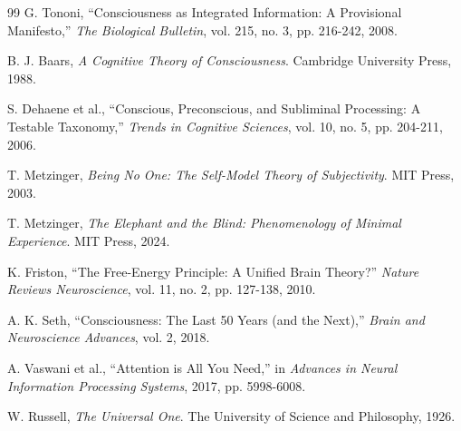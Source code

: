 \documentclass[11pt]{article}
\begin{document}
\begin{thebibliography}{99}
G. Tononi, ``Consciousness as Integrated Information: A Provisional Manifesto,'' \textit{The Biological Bulletin}, vol. 215, no. 3, pp. 216-242, 2008.

B. J. Baars, \textit{A Cognitive Theory of Consciousness}. Cambridge University Press, 1988.

S. Dehaene et al., ``Conscious, Preconscious, and Subliminal Processing: A Testable Taxonomy,'' \textit{Trends in Cognitive Sciences}, vol. 10, no. 5, pp. 204-211, 2006.

T. Metzinger, \textit{Being No One: The Self-Model Theory of Subjectivity}. MIT Press, 2003.

T. Metzinger, \textit{The Elephant and the Blind: Phenomenology of Minimal Experience}. MIT Press, 2024.

K. Friston, ``The Free-Energy Principle: A Unified Brain Theory?'' \textit{Nature Reviews Neuroscience}, vol. 11, no. 2, pp. 127-138, 2010.

A. K. Seth, ``Consciousness: The Last 50 Years (and the Next),'' \textit{Brain and Neuroscience Advances}, vol. 2, 2018.

A. Vaswani et al., ``Attention is All You Need,'' in \textit{Advances in Neural Information Processing Systems}, 2017, pp. 5998-6008.

W. Russell, \textit{The Universal One}. The University of Science and Philosophy, 1926.

\end{thebibliography}
\end{document}

